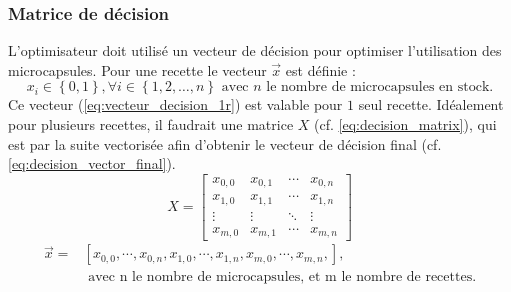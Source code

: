 \subsubsection{Matrice de décision}
L'optimisateur doit utilisé un vecteur de décision pour optimiser l'utilisation des \glspl{microcapsule}. Pour une recette le vecteur $\overrightarrow{x}$ est définie :
\begin{equation}
    x_{i}\in \left\{0, 1\right\}, \forall i\in\left\{1, 2, \dots, n\right\} \text{ avec } n\text{ le nombre de microcapsules en stock.}
    \label{eq:vecteur_decision_1r}
\end{equation}
Ce vecteur (\autoref{eq:vecteur_decision_1r}) est valable pour $1$ seul recette. Idéalement pour plusieurs recettes, il faudrait une matrice $X$ (cf. \autoref{eq:decision_matrix}), qui est par la suite \og vectorisée \fg afin d'obtenir le vecteur de décision final (cf. \autoref{eq:decision_vector_final}). 
\begin{equation}
    X = \left[
        \begin{array}{cccc}
            x_{0, 0} & x_{0, 1} & \cdots & x_{0, n} \\
            x_{1, 0} & x_{1, 1} & \cdots & x_{1, n} \\
            \vdots   & \vdots   & \ddots & \vdots \\
            x_{m, 0} & x_{m, 1} & \cdots & x_{m, n}
        \end{array}
        \right]
    \label{eq:decision_matrix}
\end{equation}
\begin{equation}
    \begin{split}
        \overrightarrow{x} = &\left[x_{0, 0}, \cdots, x_{0, n}, x_{1, 0}, \cdots, x_{1, n}, x_{m, 0}, \cdots, x_{m, n}, \right],\\
        &\text{ avec n le nombre de microcapsules, et m le nombre de recettes.}
    \end{split}
    \label{eq:decision_vector_final}
\end{equation}
